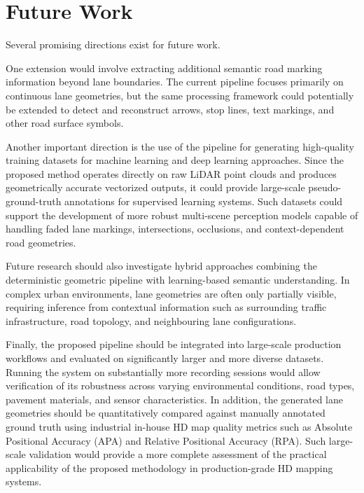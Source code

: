 \section{Future Work}
\label{sec:future_work}

Several promising directions exist for future work.

One extension would involve extracting additional semantic road marking information beyond lane boundaries.
The current pipeline focuses primarily on continuous lane geometries, but the same processing framework could potentially be extended to detect and reconstruct arrows, stop lines, text markings, and other road surface symbols.

Another important direction is the use of the pipeline for generating high-quality training datasets for machine learning and deep learning approaches.
Since the proposed method operates directly on raw LiDAR point clouds and produces geometrically accurate vectorized outputs, it could provide large-scale pseudo-ground-truth annotations for supervised learning systems.
Such datasets could support the development of more robust multi-scene perception models capable of handling faded lane markings, intersections, occlusions, and context-dependent road geometries.

Future research should also investigate hybrid approaches combining the deterministic geometric pipeline with learning-based semantic understanding.
In complex urban environments, lane geometries are often only partially visible, requiring inference from contextual information such as surrounding traffic infrastructure, road topology, and neighbouring lane configurations.

Finally, the proposed pipeline should be integrated into large-scale production workflows and evaluated on significantly larger and more diverse datasets.
Running the system on substantially more recording sessions would allow verification of its robustness across varying environmental conditions, road types, pavement materials, and sensor characteristics.
In addition, the generated lane geometries should be quantitatively compared against manually annotated ground truth using industrial in-house HD map quality metrics such as Absolute Positional Accuracy (APA) and Relative Positional Accuracy (RPA).
Such large-scale validation would provide a more complete assessment of the practical applicability of the proposed methodology in production-grade HD mapping systems.
